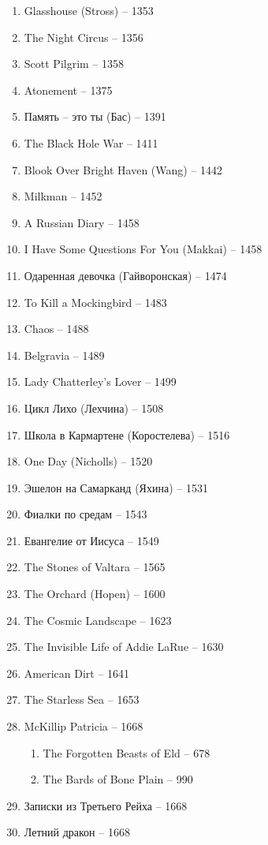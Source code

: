 \documentclass[a4paper, 11pt]{proc} %
\begin{document}
\begin{enumerate}
    \item Glasshouse (Stross) -- 1353
    \item The Night Circus -- 1356
    \item Scott Pilgrim -- 1358
    \item Atonement -- 1375
    \item Память -- это ты (Бас) -- 1391
    \item The Black Hole War -- 1411
    \item Blook Over Bright Haven (Wang) -- 1442
    \item Milkman -- 1452
    \item A Russian Diary -- 1458
    \item I Have Some Questions For You (Makkai) -- 1458
    \item Одаренная девочка (Гайворонская) -- 1474
    \item To Kill a Mockingbird -- 1483
    \item Chaos -- 1488
    \item Belgravia -- 1489
    \item Lady Chatterley's Lover -- 1499
    \item Цикл Лихо (Лехчина) -- 1508
    \item Школа в Кармартене (Коростелева) -- 1516
    \item One Day (Nicholls) -- 1520
    \item Эшелон на Самарканд (Яхина) -- 1531
    \item Фиалки по средам -- 1543
    \item Евангелие от Иисуса -- 1549
    \item The Stones of Valtara -- 1565
    \item The Orchard (Hopen) -- 1600
    \item The Cosmic Landscape -- 1623
    \item The Invisible Life of Addie LaRue -- 1630
    \item American Dirt -- 1641
    \item The Starless Sea -- 1653
    \item McKillip Patricia -- 1668
        \begin{enumerate}
            \item The Forgotten Beasts of Eld -- 678
            \item The Bards of Bone Plain -- 990
        \end{enumerate}
    \item Записки из Третьего Рейха -- 1668
    \item Летний дракон -- 1668

\end{enumerate}
\end{document}
